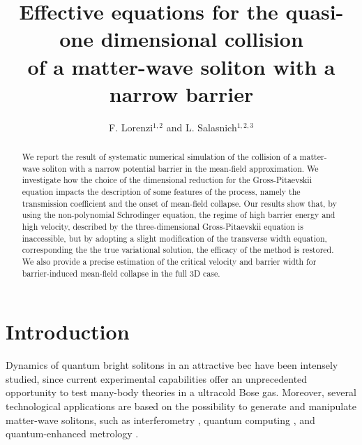 \documentclass[pra,twocolumn]{revtex4-2}
\begin{document}
\title{Effective equations for the quasi-one dimensional collision \\ of a matter-wave soliton with a narrow barrier}

\author{F. Lorenzi$^{1,2}$ and L. Salasnich$^{1,2,3}$}

\begin{abstract}
We report the result of systematic numerical simulation of the collision of a matter-wave soliton with a narrow potential barrier in the mean-field approximation. We investigate how the choice of the dimensional reduction for the Gross-Pitaevskii equation impacts the description of some features of the process, namely the transmission coefficient and the onset of mean-field collapse. Our results show that, by using the non-polynomial Schrodinger equation, the regime of high barrier energy and high velocity, described by the three-dimensional Gross-Pitaevskii equation is inaccessible, but by adopting a slight modification of the transverse width equation, corresponding the the true variational solution, the efficacy of the method is restored. We also provide a precise estimation of the critical velocity and barrier width for barrier-induced mean-field collapse in the full 3D case.
\end{abstract}

\maketitle
%
\begingroup
\let\clearpage\relax

\section{Introduction}\label{sec:intro}
  Dynamics of quantum bright solitons in an attractive \gls{bec} have been intensely studied, since current experimental capabilities offer an unprecedented opportunity to test many-body theories in a ultracold Bose gas. Moreover, several technological applications are based on the possibility to generate and manipulate matter-wave solitons, such as interferometry \cite{helm-splitting}, quantum computing \cite{}, and quantum-enhanced metrology \cite{}.
\end{document}
